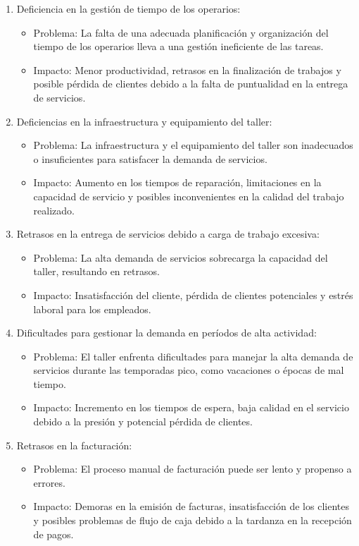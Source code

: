 \begin{enumerate}
    \item Deficiencia en la gestión de tiempo de los operarios:
    \begin{itemize}
        \item Problema: La falta de una adecuada planificación y organización del tiempo de los operarios lleva a una gestión ineficiente de las tareas.
        \item Impacto: Menor productividad, retrasos en la finalización de trabajos y posible pérdida de clientes debido a la falta de puntualidad en la entrega de servicios.
    \end{itemize}

    \item Deficiencias en la infraestructura y equipamiento del taller:
    \begin{itemize}
        \item Problema: La infraestructura y el equipamiento del taller son inadecuados o insuficientes para satisfacer la demanda de servicios.
        \item Impacto: Aumento en los tiempos de reparación, limitaciones en la capacidad de servicio y posibles inconvenientes en la calidad del trabajo realizado.
    \end{itemize}

    \item Retrasos en la entrega de servicios debido a carga de trabajo excesiva:
    \begin{itemize}
        \item Problema: La alta demanda de servicios sobrecarga la capacidad del taller, resultando en retrasos.
        \item Impacto: Insatisfacción del cliente, pérdida de clientes potenciales y estrés laboral para los empleados.
    \end{itemize}

    \item Dificultades para gestionar la demanda en períodos de alta actividad:
    \begin{itemize}
        \item Problema: El taller enfrenta dificultades para manejar la alta demanda de servicios durante las temporadas pico, como vacaciones o épocas de mal tiempo.
        \item Impacto: Incremento en los tiempos de espera, baja calidad en el servicio debido a la presión y potencial pérdida de clientes.
    \end{itemize}
    
    \item Retrasos en la facturación:
    \begin{itemize}
        \item Problema: El proceso manual de facturación puede ser lento y propenso a errores.
        \item Impacto: Demoras en la emisión de facturas, insatisfacción de los clientes y posibles problemas de flujo de caja debido a la tardanza en la recepción de pagos.
    \end{itemize}    
    

\end{enumerate}
